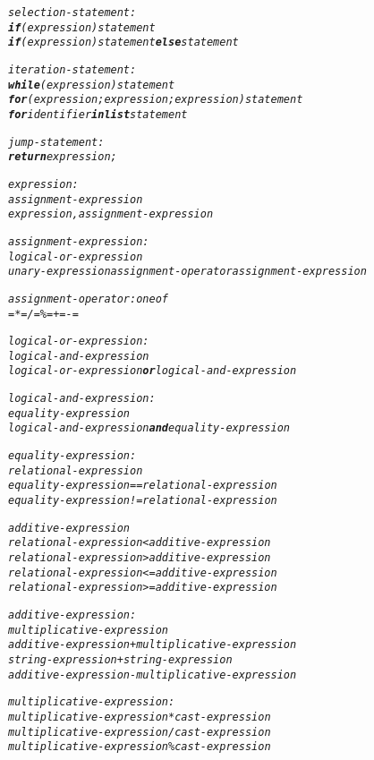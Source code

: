 \documentclass[12pt]{report}
\begin{document}
\begin{alltt}
     \textit{selection-statement:}
          \textit{\textbf{if} (expression) statement}
          \textit{\textbf{if} (expression) statement \textbf{else} statement}
          
     \textit{iteration-statement:}
          \textit{\textbf{while} (expression) statement}
          \textit{\textbf{for} (expression; expression; expression) statement}
          \textit{\textbf{for} identifier \textbf{in list} statement}
          
     \textit{jump-statement:}
          \textit{\textbf{return} expression;}
          
     \textit{expression:}
          \textit{assignment-expression}
          \textit{expression , assignment-expression}
          
     \textit{assignment-expression:}
          \textit{logical-or-expression}
          \textit{unary-expression assignment-operator assignment-expression}
          
     \textit{assignment-operator: one of}
          \textit{=    *=    /=    \%=    +=    -=}
          
     \textit{logical-or-expression:}
          \textit{logical-and-expression}
          \textit{logical-or-expression \textbf{or} logical-and-expression}
          
     \textit{logical-and-expression:}
          \textit{equality-expression}
          \textit{logical-and-expression \textbf{and} equality-expression}
          
     \textit{equality-expression:}
          \textit{relational-expression}
          \textit{equality-expression == relational-expression}
          \textit{equality-expression != relational-expression}
          
     \textit{additive-expression}
          \textit{relational-expression < additive-expression}
          \textit{relational-expression > additive-expression}
          \textit{relational-expression <= additive-expression}
          \textit{relational-expression >= additive-expression}
          
     \textit{additive-expression:}
          \textit{multiplicative-expression}
          \textit{additive-expression + multiplicative-expression}
          \textit{string-expression + string-expression}
          \textit{additive-expression - multiplicative-expression}
          
     \textit{multiplicative-expression:}
          \textit{multiplicative-expression * cast-expression}
          \textit{multiplicative-expression / cast-expression}
          \textit{multiplicative-expression \% cast-expression}
          

\end{alltt}
\end{document}
